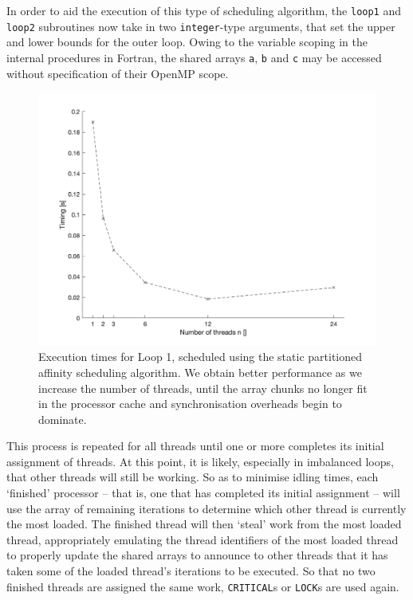 \documentclass{article} %
\newcommand{\tp}{\texttt}
\begin{document}
In order to aid the execution of this type of scheduling algorithm, the \tp{loop1} and \tp{loop2} subroutines now take in two \tp{integer}-type arguments, that set the upper and lower bounds for the outer loop.
Owing to the variable scoping in the internal procedures in Fortran, the shared arrays \tp{a}, \tp{b} and \tp{c} may be accessed without specification of their OpenMP scope.

\begin{figure}
    \centering
    \includegraphics[height=.3\textheight]{part2_plots/affinity_loop1}
    \caption{Execution times for Loop 1, scheduled using the static partitioned affinity scheduling algorithm. We obtain better performance as we increase the number of threads, until the array chunks no longer fit in the processor cache and synchronisation overheads begin to dominate.}
    \label{fig:affinityloop1}
\end{figure}

This process is repeated for all threads until one or more completes its initial assignment of threads.
At this point, it is likely, especially in imbalanced loops, that other threads will still be working.
So as to minimise idling times, each `finished' processor -- that is, one that has completed its initial assignment -- will use the array of remaining iterations to determine which other thread is currently the most loaded.
The finished thread will then `steal' work from the most loaded thread, appropriately emulating the thread identifiers of the most loaded thread to properly update the shared arrays to announce to other threads that it has taken some of the loaded thread's iterations to be executed.
So that no two finished threads are assigned the same work, \tp{CRITICAL}s or \tp{LOCK}s are used again.
\end{document}
